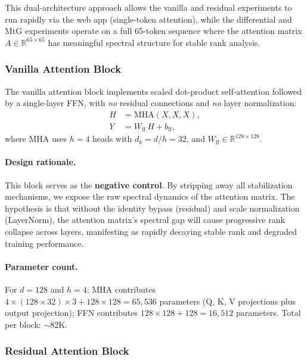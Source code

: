 \documentclass[12pt, a4paper]{article}
\begin{document}
This dual-architecture approach allows the vanilla and residual
experiments to run rapidly via the web app (single-token attention),
while the differential and MtG experiments operate on a full 65-token
sequence where the attention matrix $A \in \mathbb{R}^{65 \times 65}$
has meaningful spectral structure for stable rank analysis.

\subsubsection{Vanilla Attention Block}

The vanilla attention block implements scaled dot-product self-attention
followed by a single-layer FFN, with \textit{no} residual connections
and \textit{no} layer normalization:
\begin{align}
    H &= \text{MHA}(X, X, X), \label{eq:vanilla_mha} \\
    Y &= W_{\text{ff}}\, H + b_{\text{ff}}, \label{eq:vanilla_ff}
\end{align}
where $\text{MHA}$ uses $h = 4$ heads with $d_k = d/h = 32$, and
$W_{\text{ff}} \in \mathbb{R}^{128 \times 128}$.

\paragraph{Design rationale.}
This block serves as the \textbf{negative control}. By stripping away
all stabilization mechanisms, we expose the raw spectral dynamics of the
attention matrix. The hypothesis is that without the identity bypass
(residual) and scale normalization (LayerNorm), the attention matrix's
spectral gap will cause progressive rank collapse across layers,
manifesting as rapidly decaying stable rank and degraded training
performance.

\paragraph{Parameter count.}
For $d = 128$ and $h = 4$: MHA contributes $4 \times (128 \times 32)
\times 3 + 128 \times 128 = 65{,}536$ parameters (Q, K, V projections
plus output projection); FFN contributes $128 \times 128 + 128 =
16{,}512$ parameters. Total per block: ${\sim}82$K.

\subsubsection{Residual Attention Block}
\end{document}
